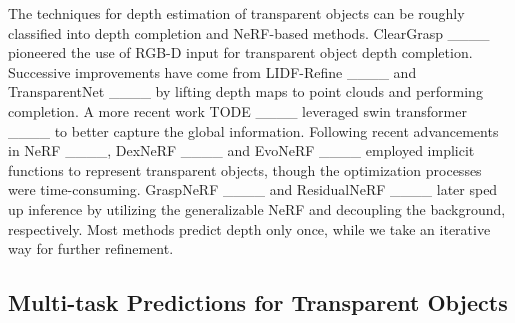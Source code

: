 The techniques for depth estimation of transparent objects can be roughly classified into depth completion and NeRF-based methods. ClearGrasp ____ pioneered the use of RGB-D input for transparent object depth completion. Successive improvements have come from LIDF-Refine ____ and TransparentNet ____ by lifting depth maps to point clouds and performing completion. A more recent work TODE ____ leveraged swin transformer ____ to better capture the global information. Following recent advancements in NeRF ____, DexNeRF ____ and EvoNeRF ____ employed implicit functions to represent transparent objects, though the optimization processes were time-consuming. GraspNeRF ____ and ResidualNeRF ____ later sped up inference by utilizing the generalizable NeRF and decoupling the background, respectively. Most methods predict depth only once, while we take an iterative way for further refinement.

\subsection{Multi-task Predictions for Transparent Objects}


